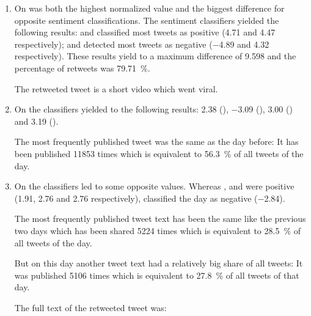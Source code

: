 \begin{enumerate}
    \item 
        On  was both the highest normalized value and the biggest difference for opposite sentiment classifications.
        The sentiment classifiers yielded the following results: \ftb{} and \fme{} classified most tweets as positive (\num{4.71} and \num{4.47} respectively); \fnb{} and \fsvm{} detected most tweets as negative (\num{-4.89} and \num{4.32} respectively).
        These results yield to a maximum difference of \num{9.598} and the percentage of retweets was \SI{79.71}{\percent}.


        The retweeted tweet is a short video which went viral.
        \nocite{tweet.toyota.1}

    \item 
        On  the classifiers yielded to the following results: 
        \num{2.38} (\ftb{}), \num{-3.09} (\fnb{}), \num{3.00} (\fme{}) and \num{3.19} (\fsvm{}).

        The most frequently published tweet was the same as the day before:
        It has been published \num{11853} times which is equivalent to \SI{56.3}{\percent} of all tweets of the day.
    
    \item 
        On  the classifiers led to some opposite values. 
        Whereas \ftb{}, \fme{} and \fsvm{} were positive (\num{1.91}, \num{2.76} and \num{2.76} respectively), \fnb{} classified the day as negative (\num{-2.84}).
        
        The most frequently published tweet text has been the same like the previous two days which has been shared \num{5224} times which is equivalent to \SI{28.5}{\percent} of all tweets of the day.

        But on this day another tweet text had a relatively big share of all tweets:
        It was published \num{5106} times which is equivalent to \SI{27.8}{\percent} of all tweets of that day.

        The full text of the retweeted tweet was:

\end{enumerate}

